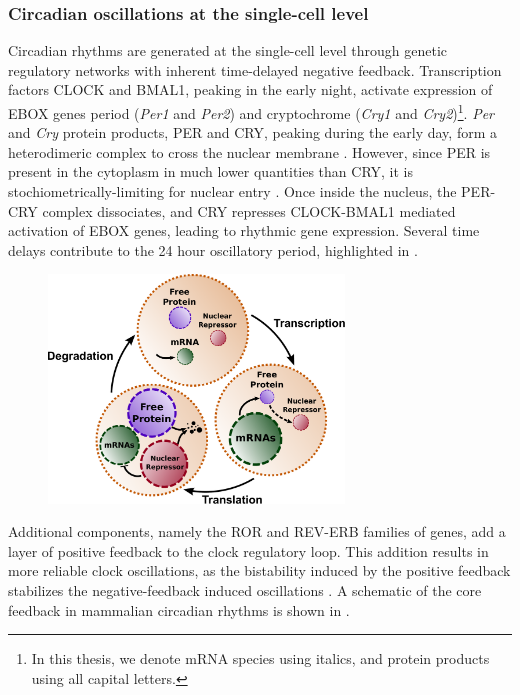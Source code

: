 \subsubsection{Circadian oscillations at the single-cell level}
Circadian rhythms are generated at the single-cell level through genetic regulatory networks with inherent time-delayed negative feedback. 
Transcription factors CLOCK and BMAL1, peaking in the early night, activate expression of EBOX genes period ({\itshape Per1} and {\itshape Per2}) and cryptochrome ({\itshape Cry1} and {\itshape Cry2})\footnote{In this thesis, we denote mRNA species using italics, and protein products using all capital letters.}.
{\itshape Per} and {\itshape Cry} protein products, PER and CRY, peaking during the early day, form a heterodimeric complex to cross the nuclear membrane \cite{Ko2006}. 
However, since PER is present in the cytoplasm in much lower quantities than CRY, it is stochiometrically-limiting for nuclear entry \cite{Lee2001}. 
Once inside the nucleus, the PER-CRY complex dissociates, and CRY represses CLOCK-BMAL1 mediated activation of EBOX genes, leading to rhythmic gene expression.
Several time delays contribute to the 24 hour oscillatory period, highlighted in .

\begin{figure}[tbp]
  \centering
  \includegraphics[width=0.7\textwidth]{chap1/figures/maindelays.pdf}
  \label{fig:maindelays}
\end{figure}

Additional components, namely the ROR and REV-ERB families of genes, add a layer of positive feedback to the clock regulatory loop.
This addition results in more reliable clock oscillations, as the bistability induced by the positive feedback stabilizes the negative-feedback induced oscillations \cite{Ananthasubramaniam2014a}.
A schematic of the core feedback in mammalian circadian rhythms is shown in .

